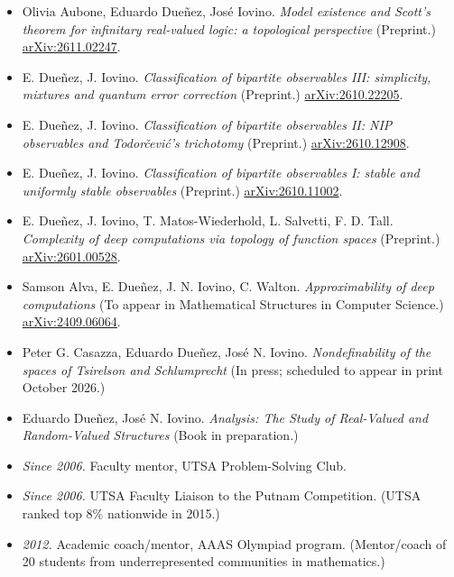 \documentclass[11pt,a4paper,ragged2e,withhyper]{altacv}
\begin{document}
\begin{itemize}
\item Olivia Aubone, Eduardo Due{\~n}ez, Jos{\'e} Iovino. \emph{Model existence and {S}cott's theorem for infinitary real-valued logic: a topological perspective} (Preprint.) \href{https://arxiv.org/abs/2611.02247}{arXiv:2611.02247}.
\item E. Due{\~n}ez, J. Iovino. \emph{Classification of bipartite observables {III}: simplicity, mixtures and quantum error correction} (Preprint.) \href{https://arxiv.org/abs/2610.22205}{arXiv:2610.22205}.
\item E. Due{\~n}ez, J. Iovino. \emph{Classification of bipartite observables {II}: {NIP} observables and {Todor\v{c}evi\'c}'s trichotomy} (Preprint.) \href{https://arxiv.org/abs/2610.12908}{arXiv:2610.12908}.
\item E. Due{\~n}ez, J. Iovino. \emph{Classification of bipartite observables {I}: stable and uniformly stable observables} (Preprint.) \href{https://arxiv.org/abs/2610.11002}{arXiv:2610.11002}.
\item E. Due{\~n}ez, J. Iovino, T. Matos-Wiederhold, L. Salvetti, F. D. Tall. \emph{Complexity of deep computations via topology of function spaces} (Preprint.) \href{https://doi.org/10.48550/arXiv.2601.00528}{arXiv:2601.00528}.
\item Samson Alva, E. Dueñez, J. N. Iovino, C. Walton. \emph{Approximability of deep computations} (To appear in Mathematical Structures in Computer Science.) \href{https://doi.org/10.48550/arXiv.2409.06064}{arXiv:2409.06064}.
\item Peter G. Casazza, Eduardo Due\~{n}ez, Jos{\'e} N. Iovino. \emph{Nondefinability of the spaces of Tsirelson and Schlumprecht} (In press; scheduled to appear in print October 2026.)
\item Eduardo Due\~{n}ez, Jos\'{e} N. Iovino. \emph{Analysis: The Study of Real-Valued and Random-Valued Structures} (Book in preparation.)
\end{itemize}

\begin{itemize}
\item\emph{Since 2006.} Faculty mentor, UTSA Problem-Solving Club.
\item\emph{Since 2006.} UTSA Faculty Liaison to the Putnam Competition. (UTSA ranked top 8\% nationwide in 2015.)
\item\emph{2012.} Academic coach/mentor, AAAS Olympiad program. (Mentor/coach of 20 students from underrepresented communities in mathematics.)
\end{itemize}
\end{document}
